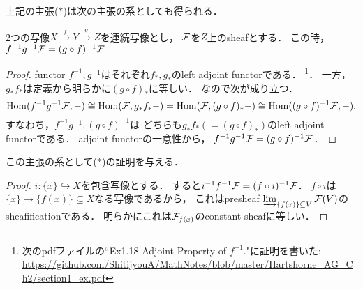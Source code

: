 \documentclass[a4paper]{jsarticle}
\begin{document}
上記の主張($*$)は次の主張の系としても得られる．
\begin{Claim}
    2つの写像$X \xrightarrow{f} Y \xrightarrow{g} Z$を連続写像とし，
    $\mathcal{F}$を$Z$上のsheafとする．
    この時，$f^{-1}g^{-1}\mathcal{F}=(g \circ f)^{-1}\mathcal{F}$
\end{Claim}
\begin{proof}
    functor $f^{-1}, g^{-1}$はそれぞれ$f_*,g_*$のleft adjoint functorである．
    \footnote
    {
        次のpdfファイルの``Ex1.18 Adjoint Property of $f^{-1}$."に証明を書いた:
        \url{https://github.com/ShitijyouA/MathNotes/blob/master/Hartshorne_AG_Ch2/section1_ex.pdf}
    }．
    一方，$g_* f_*$は定義から明らかに$(g \circ f)_*$に等しい．
    なので次が成り立つ．
    \[
        \operatorname{Hom}(f^{-1}g^{-1}\mathcal{F}, -)
        \cong \operatorname{Hom}(\mathcal{F}, g_* f_* -)
        =\operatorname{Hom}(\mathcal{F}, (g \circ f)_* -)
        \cong \operatorname{Hom}((g \circ f)^{-1} \mathcal{F},  -).
    \]
    すなわち，$f^{-1}g^{-1}, (g \circ f)^{-1}$は
    どちらも$g_* f_*(=(g \circ f)_*)$のleft adjoint functorである．
    adjoint functorの一意性から，
    $f^{-1}g^{-1}\mathcal{F}=(g \circ f)^{-1}\mathcal{F}$．
\end{proof}

この主張の系として($*$)の証明を与える．
\begin{proof}
    $i: \{x\} \hookrightarrow X$を包含写像とする．
    すると$i^{-1}f^{-1} \mathcal{F}=(f \circ i)^{-1} \mathcal{F}$．
    $f \circ i$は$\{x\} \to \{f(x)\} \subseteq X$なる写像であるから，
    これはpresheaf $\varinjlim_{\{f(x)\} \subseteq V} \mathcal{F}(V)$の
    sheafificationである．
    明らかにこれは$\mathcal{F}_{f(x)}$のconstant sheafに等しい．
\end{proof}
\end{document}
